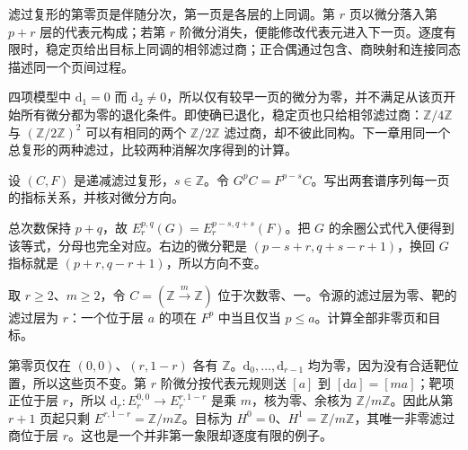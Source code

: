 





\begin{chaptersummary}
	滤过复形的第零页是伴随分次，第一页是各层的上同调。第 \(r\) 页以微分落入第 \(p+r\) 层的代表元构成；若第 \(r\) 阶微分消失，便能修改代表元进入下一页。逐度有限时，稳定页给出目标上同调的相邻滤过商；正合偶通过包含、商映射和连接同态描述同一个页间过程。

	\ProseParagraphBreak
	四项模型中 \(\mathrm d_1=0\) 而 \(\mathrm d_2\ne0\)，所以仅有较早一页的微分为零，并不满足从该页开始所有微分都为零的退化条件。即使确已退化，稳定页也只给相邻滤过商：\(\mathbb Z/4\mathbb Z\) 与 \((\mathbb Z/2\mathbb Z)^2\) 可以有相同的两个 \(\mathbb Z/2\mathbb Z\) 滤过商，却不彼此同构。下一章用同一个总复形的两种滤过，比较两种消解次序得到的计算。
\end{chaptersummary}

\BookExercises

\begin{exercise}\label{b4:ex:14-reindex}
	设 \((C,F)\) 是递减滤过复形，\(s\in\mathbb Z\)。令 \(G^pC=F^{p-s}C\)。写出两套谱序列每一页的指标关系，并核对微分方向。
\end{exercise}
\begin{solution}
	总次数保持 \(p+q\)，故 \(E_r^{p,q}(G)=E_r^{p-s,q+s}(F)\)。把 \(G\) 的余圈公式代入便得到该等式，分母也完全对应。右边的微分靶是 \((p-s+r,q+s-r+1)\)，换回 \(G\) 指标就是 \((p+r,q-r+1)\)，所以方向不变。
\end{solution}

\begin{exercise}\label{b4:ex:14-single-jump}
	取 \(r\ge2\)、\(m\ge2\)，令 \(C=(\mathbb Z\xrightarrow{m}\mathbb Z)\) 位于次数零、一。令源的滤过层为零、靶的滤过层为 \(r\)：一个位于层 \(a\) 的项在 \(F^p\) 中当且仅当 \(p\le a\)。计算全部非零页和目标。
\end{exercise}
\begin{solution}
	第零页仅在 \((0,0)\)、\((r,1-r)\) 各有 \(\mathbb Z\)。\(\mathrm{d}_0,\ldots,\mathrm{d}_{r-1}\) 均为零，因为没有合适靶位置，所以这些页不变。第 \(r\) 阶微分按代表元规则送 \([a]\) 到 \([\mathrm da]=[ma]\)；靶项正位于层 \(r\)，所以 \(\mathrm d_r:E_r^{0,0}\to E_r^{r,1-r}\) 是乘 \(m\)，核为零、余核为 \(\mathbb Z/m\mathbb Z\)。因此从第 \(r+1\) 页起只剩 \(E^{r,1-r}=\mathbb Z/m\mathbb Z\)。目标为 \(H^0=0\)、\(H^1=\mathbb Z/m\mathbb Z\)，其唯一非零滤过商位于层 \(r\)。这也是一个并非第一象限却逐度有限的例子。
\end{solution}

